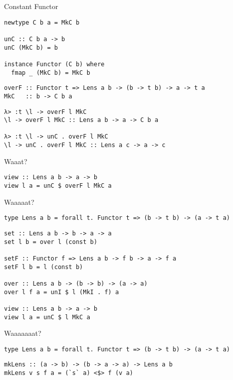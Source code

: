 \documentclass[presentation,aspectratio=169,8pt]{beamer}
\begin{document}
\begin{frame}[label={sec:orge58f939},fragile]{Constant Functor}
 \begin{verbatim}
newtype C b a = MkC b

unC :: C b a -> b
unC (MkC b) = b

instance Functor (C b) where
  fmap _ (MkC b) = MkC b
\end{verbatim}

\pause

\begin{verbatim}
overF :: Functor t => Lens a b -> (b -> t b) -> a -> t a
MkC   :: b -> C b a
\end{verbatim}

\pause

\begin{verbatim}
λ> :t \l -> overF l MkC
\l -> overF l MkC :: Lens a b -> a -> C b a

λ> :t \l -> unC . overF l MkC
\l -> unC . overF l MkC :: Lens a c -> a -> c
\end{verbatim}
\end{frame}

\begin{frame}[label={sec:orgd59e811},fragile]{Waaat?}
 \begin{verbatim}
view :: Lens a b -> a -> b
view l a = unC $ overF l MkC a
\end{verbatim}
\end{frame}

\begin{frame}[label={sec:org676b2af},fragile]{Waaaaat?}
 \begin{verbatim}
type Lens a b = forall t. Functor t => (b -> t b) -> (a -> t a)
\end{verbatim}

\pause

\begin{verbatim}
set :: Lens a b -> b -> a -> a
set l b = over l (const b)

setF :: Functor f => Lens a b -> f b -> a -> f a
setF l b = l (const b)

over :: Lens a b -> (b -> b) -> (a -> a)
over l f a = unI $ l (MkI . f) a

view :: Lens a b -> a -> b
view l a = unC $ l MkC a
\end{verbatim}
\end{frame}

\begin{frame}[label={sec:orgb887df5},fragile]{Waaaaaaat?}
 \begin{verbatim}
type Lens a b = forall t. Functor t => (b -> t b) -> (a -> t a)
\end{verbatim}

\pause

\begin{verbatim}
mkLens :: (a -> b) -> (b -> a -> a) -> Lens a b
mkLens v s f a = (`s` a) <$> f (v a)
\end{verbatim}
\end{frame}
\end{document}
